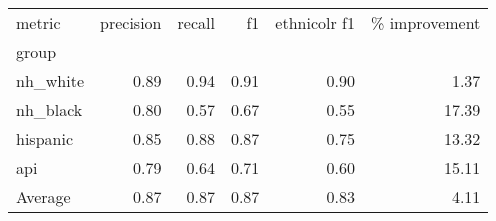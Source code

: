\begin{tabular}{lrrrrr}
\toprule
metric &  precision &  recall &    f1 &  ethnicolr f1 &  \% improvement \\
group    &            &         &       &               &                \\
\midrule
nh\_white &       0.89 &    0.94 &  0.91 &          0.90 &           1.37 \\
nh\_black &       0.80 &    0.57 &  0.67 &          0.55 &          17.39 \\
hispanic &       0.85 &    0.88 &  0.87 &          0.75 &          13.32 \\
api      &       0.79 &    0.64 &  0.71 &          0.60 &          15.11 \\
\midrule
Average      &       0.87 &    0.87 &  0.87 &          0.83 &           4.11 \\
\bottomrule
\end{tabular}
